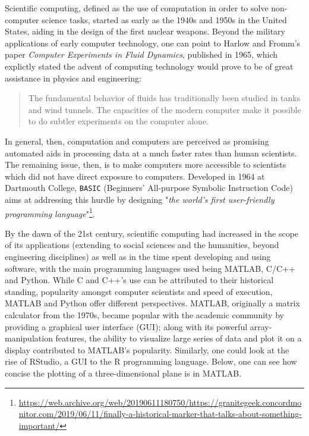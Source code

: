 Scientific computing, defined as the use of computation in order to solve non-computer science tasks, started as early as the 1940s and 1950s in the United States, aiding in the design of the first nuclear weapons\cite{oberkampf_verification_2010}. Beyond the military applications of early computer technology, one can point to Harlow and Fromm's paper \emph{Computer Experiments in Fluid Dynamics}, published in 1965, which explictly stated the advent of computing technology would prove to be of great assistance in physics and engineering:

\begin{quote}
  The fundamental behavior of fluids has traditionally been studied in tanks and wind tunnels. The capacities of the modern computer make it possible to do subtler experiments on the computer alone.\cite{harlow_computer_1965}
\end{quote}

In general, then, computation and computers are perceived as promising automated aids in processing data at a much faster rates than human scientists\cite{licklider_man-computer_1960}. The remaining issue, then, is to make computers more accessible to scientists which did not have direct exposure to computers. Developed in 1964 at Dartmouth College, \lstinline{BASIC} (Beginners' All-purpose Symbolic Instruction Code) aims at addressing this hurdle by designing "\emph{the world's first user-friendly programming language}"\footnote{\url{https://web.archive.org/web/20190611180750/https://granitegeek.concordmonitor.com/2019/06/11/finally-a-historical-marker-that-talks-about-something-important/}}.

By the dawn of the 21st century, scientific computing had increased in the scope of its applications (extending to social sciences and the humanities, beyond engineering disciplines) as well as in the time spent developing and using software\cite{prabhu_survey_2011}\cite{hannay_how_2009}, with the main programming languages used being MATLAB, C/C++ and Python. While C and C++'s use can be attributed to their historical standing, popularity amongst computer scientists and speed of execution, MATLAB and Python offer different perspectives. MATLAB, originally a matrix calculator from the 1970s, became popular with the academic community by providing a graphical user interface (GUI)\cite{moler_history_2020}; along with its powerful array-manipulation features, the ability to visualize large series of data and plot it on a display contributed to MATLAB's popularity\cite{moler_history_2020}. Similarly, one could look at the rise of RStudio, a GUI to the R programming language. Below, one can see how concise the plotting of a three-dimensional plane is in MATLAB.


